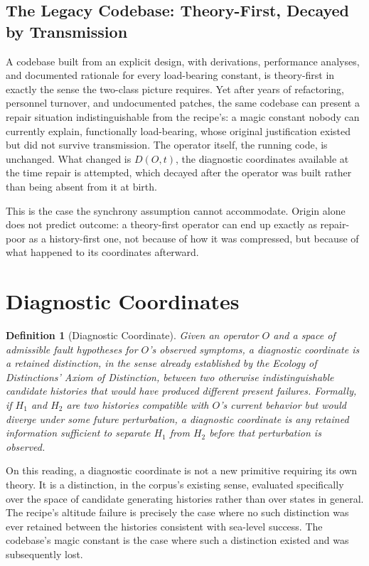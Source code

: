 \documentclass[11pt]{article}
\newtheorem{definition}{Definition}[section]
\begin{document}
\subsection{The Legacy Codebase: Theory-First, Decayed by Transmission}

A codebase built from an explicit design, with derivations, performance analyses, and documented rationale for every load-bearing constant, is theory-first in exactly the sense the two-class picture requires. Yet after years of refactoring, personnel turnover, and undocumented patches, the same codebase can present a repair situation indistinguishable from the recipe's: a magic constant nobody can currently explain, functionally load-bearing, whose original justification existed but did not survive transmission. The operator itself, the running code, is unchanged. What changed is $D(O,t)$, the diagnostic coordinates available at the time repair is attempted, which decayed after the operator was built rather than being absent from it at birth.

This is the case the synchrony assumption cannot accommodate. Origin alone does not predict outcome: a theory-first operator can end up exactly as repair-poor as a history-first one, not because of how it was compressed, but because of what happened to its coordinates afterward.

\section{Diagnostic Coordinates}

\begin{definition}[Diagnostic Coordinate]
Given an operator $O$ and a space of admissible fault hypotheses for $O$'s observed symptoms, a diagnostic coordinate is a retained distinction, in the sense already established by the Ecology of Distinctions' Axiom of Distinction, between two otherwise indistinguishable candidate histories that would have produced different present failures. Formally, if $H_1$ and $H_2$ are two histories compatible with $O$'s current behavior but would diverge under some future perturbation, a diagnostic coordinate is any retained information sufficient to separate $H_1$ from $H_2$ before that perturbation is observed.
\end{definition}

On this reading, a diagnostic coordinate is not a new primitive requiring its own theory. It is a distinction, in the corpus's existing sense, evaluated specifically over the space of candidate generating histories rather than over states in general. The recipe's altitude failure is precisely the case where no such distinction was ever retained between the histories consistent with sea-level success. The codebase's magic constant is the case where such a distinction existed and was subsequently lost.
\end{document}
